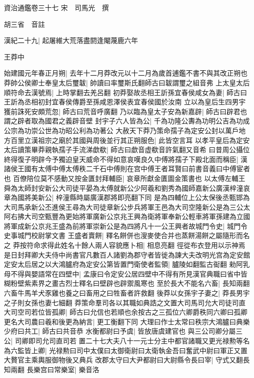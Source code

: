 資治通鑑卷三十七
宋　司馬光　撰

胡三省　音註

漢紀二十九|{
	起屠維大荒落盡閼逢閹蔑鹿六年}


王莽中

始建國元年春正月朔|{
	去年十二月莽改元以十二月為歲首逋鑑不書不與其改正朔也}
莽帥公侯卿士奉皇太后璽韍|{
	帥讀曰率璽斯氏翻師古曰韍謂璽之組音弗}
上太皇太后順符命去漢號焉|{
	上時掌翻去羌呂翻}
初莽娶故丞相王訢孫宜春侯咸女為妻|{
	師古曰王訢為丞相初封宜春侯傳爵至孫咸恩澤侯表宜春侯國於汝南}
立以為皇后生四男宇獲前誅死安頗荒忽|{
	師古曰荒音呼廣翻}
乃以臨為皇太子安為新嘉辟|{
	師古曰辟君也謂之辟者取為國君之義辟音壁}
封宇子六人皆為公|{
	千為功隆公夀為功明公吉為功成公宗為功崇公世為功昭公利為功著公}
大赦天下莽乃策命孺子為定安公封以萬戶地方百里立漢祖宗之廟於其國與周後並行其正朔服色|{
	此皆空言耳}
以孝平皇后為定安太后讀策畢莽親執孺子手流涕歔欷|{
	師古曰歔音虚欷音許氣翻又音希}
曰昔周公攝位終得復子明辟今予獨迫皇天威命不得如意哀嘆良久中傅將孺子下殿北面而稱臣|{
	漢諸侯王國有太傅中傅太傅秩二千石中傅則在宫中傅王者耳賢曰前書音義曰中傅宦者也}
百僚陪位莫不感動又按金匱封拜輔臣|{
	哀章所獻金匱圖金策書也}
以太傅左輔王舜為太師封安新公大司徒平晏為太傅就新公少阿羲和劉秀為國師嘉新公廣漢梓潼哀章為國將美新公|{
	梓潼縣時屬廣漢郡將即亮翻下同}
是為四輔位上公太保後丞甄邯為大司馬承新公丕進侯王尋為大司徒章新公步兵將軍王邑為大司空隆新公是為三公太阿右拂大司空甄豐為更始將軍廣新公京兆王興為衛將軍奉新公輕車將軍孫建為立國將軍成新公京兆王盛為前將軍崇新公是為四將凡十一公王興者故城門令史|{
	城門令史事城門校尉掌文書}
王盛者賣餅|{
	釋名餅併也溲麥使合并也蒸餅湯餅之屬隨形而名之}
莽按符命求得此姓名十餘人兩人容貌應卜相|{
	相息亮翻}
徑從布衣登用以示神焉是日封拜卿大夫侍中尚書官凡數百人諸劉為郡守者皆徙為諫大夫改明光宫為定安館定安太后居之以大鴻臚府為定安公第皆置門衛使者監領|{
	臚陵如翻監古䘖翻}
勑阿乳母不得與嬰語常在四壁中|{
	孟康曰令定安公居四壁中不得有所見漢官典職曰省中皆糊粉壁紫素界之畫古烈士釋名曰壁辟也辟禦風寒也}
至於長大不能名六畜|{
	長知兩翻六畜牛馬羊犬豕雞也養之曰畜用之曰牲畜者許救翻}
後莽以女孫宇子妻之|{
	莽長男宇之子則女孫也妻七細翻}
莽策命羣司各以其職如典誥之文置大司馬司允大司徒司直大司空司若位皆孤卿|{
	師古曰允信也若順也余按古之三孤位六卿爵秩同六卿曰孤卿}
更名大司農曰羲和後更為納言|{
	更工衡翻下同}
大理曰作士太常曰秩宗大鴻臚曰典樂少府曰共工|{
	師古曰共音恭}
水衡都尉曰予虞|{
	皆放唐虞建官也}
與三公司卿分屬三公|{
	司卿即司允司直司若}
置二十七大夫八十一元士分主中都官諸職又更光禄勲等名為六監皆上卿|{
	光禄勲曰司中太僕曰太御衛尉曰太衛執金吾曰奮武中尉曰軍正又置大贅官主乘輿服御物後又典兵}
改郡太守曰大尹都尉曰大尉縣令長曰宰|{
	守式又翻長知兩翻}
長樂宫曰常樂室|{
	樂音洛}
